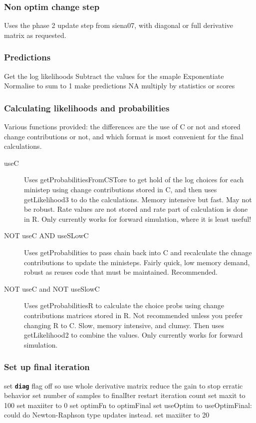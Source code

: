 \documentclass[12pt, a4paper]{article}
\renewcommand{\=}{\,=\,}
\newcommand{\+}{\,+\,}
\newcommand{\sfn}[1]{\textbf{\texttt{#1}}}
\begin{document}
\subsubsection{Non optim change step}
\label{sec:algchange}
\begin{algorithmic}
\STATE Uses the phase 2 update step from siena07, with diagonal or full
derivative matrix as requested.
\end{algorithmic}
\subsubsection{Predictions}
\label{sec:pred}
\begin{algorithmic}
\STATE Get the log likelihoods
\STATE Subtract the values for the smaple
\STATE Exponentiate
\STATE Normalise to sum to 1
\STATE make predictions NA
\ELSE
\STATE multiply by statistics or scores
\ENDIF 
\end{algorithmic}
\subsubsection{Calculating likelihoods and probabilities}
Various functions provided: the differences are the use of C or not and stored
change contributions or not, and which format is most convenient for the final
calculations.
\begin{description}
\item[useC] Uses getProbabilitiesFromCSTore to get hold of the log choices for
  each ministep using change contributions stored in C, and then uses
  getLikelihood3 to do the calculations. Memory intensive but fast. May not be
  robust. Rate values are not stored and rate part of calculation is done in
  R. Only currently works for forward simulation, where it is least useful! 
\item[NOT useC AND useSLowC] Uses getProbabilities to pass chain back into C and
  recalculate the chnage contributions to update the ministeps. Fairly quick,
  low memory demand, robust as reuses code that must be maintained. Recommended.
\item[NOT useC and NOT useSlowC] Uses getProbabilitiesR to calculate the choice
  probs using change contributions matrices stored in R. Not recommended unless
  you prefer changing R to C. Slow, memory intensive, and clumsy. Then uses 
getLikelihood2 to combine the values.  Only currently works for forward
simulation.
\end{description}
\subsubsection{Set up final iteration}
\label{sec:final}
\begin{algorithmic}
\STATE set \sfn{diag} flag off so use whole derivative matrix
\STATE reduce the gain to stop erratic behavior
\STATE set number of samples to finalIter
\STATE restart iteration count
\STATE set maxit to 100
\STATE set maxiiter to 0
\STATE set optimFn to optimFinal
\STATE set useOptim to useOptimFinal: could do Newton-Raphson type updates
instead. 
\ELSE 
\STATE set maxiiter to 20
\ENDIF
\end{algorithmic}
\end{document}
